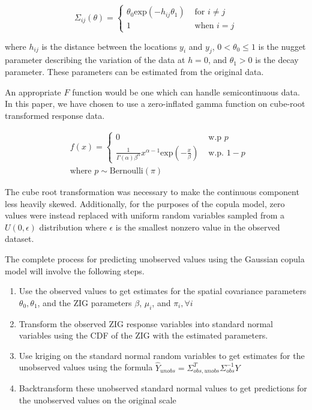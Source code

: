 \documentclass{article}
\begin{document}
$$
\Sigma_{ij}(\theta) = 
	\begin{cases}
		\theta_0 \text{exp}(-h_{ij} \theta_1) & \text{ for } i \neq j\\
		1 & \text{ when } i = j
	\end{cases}
$$

where $h_{ij}$ is the distance between the locations $y_i$ and $y_j$, $0 < \theta_0 \leq 1$ is the nugget parameter describing the variation of the data at $h = 0$, and $\theta_1 > 0$ is the decay parameter.
These parameters can be estimated from the original data.

An appropriate $F$ function would be one which can handle semicontinuous data.
In this paper, we have chosen to use a zero-inflated gamma function on cube-root transformed response data.

\begin{align*}
&f(x) = 
\begin{cases}
	0 & \text{ w.p } p \\
	\frac{1}{\Gamma(\alpha) \beta^\alpha} x^{\alpha -1} \text{exp}\left(-\frac{x}{\beta}\right) & \text{ w.p. } 1 - p 
\end{cases} 
\\
&\text{where } p \sim \text{Bernoulli}(\pi)
\end{align*}

The cube root transformation was necessary to make the continuous component less heavily skewed.
Additionally, for the purposes of the copula model, zero values were instead replaced with uniform random variables sampled from a $U(0, \epsilon)$ distribution where $\epsilon$ is the smallest nonzero value in the observed dataset.

The complete process for predicting unobserved values using the Gaussian copula model will involve the following steps.

\begin{enumerate}
	\item Use the observed values to get estimates for the spatial covariance parameters $\theta_0, \theta_1$, and the ZIG parameters $\beta$, $\mu_i$, and $\pi_i, \forall i$
	\item Transform the observed ZIG response variables into standard normal variables using the CDF of the ZIG with the estimated parameters.
	\item Use kriging on the standard normal random variables to get estimates for the unobserved values using the formula $\hat{Y}_{unobs} = \Sigma^T_{obs, unobs} \Sigma_{obs}^{-1} Y$
	\item Backtransform these unobserved standard normal values to get predictions for the unobserved values on the original scale
\end{enumerate}
\end{document}
